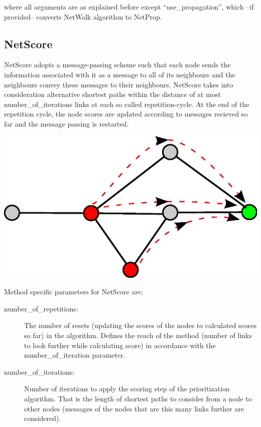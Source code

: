 \documentclass[11pt,twoside]{article}
\begin{document}
\vspace{5 mm}
where all arguments are as explained before except ``use\_propagation'', which --if provided-- converts NetWalk algorithm to NetProp.

\subsection{NetScore}
NetScore adopts a message-passing scheme such that each node sends the 
information associated with it as a message to all of its neighbours and the 
neighbours convey these messages to their neighbours. NetScore takes into 
consideration alternative shortest paths within the distance of at most 
number\_of\_iterations links at each so called repetition-cycle. At the end of 
the repetition cycle, the node scores are updated according to messages 
recieved so far and the message passing is restarted.

\includegraphics[scale=0.5]{netscore.eps}

\vspace{5 mm}
Method specific parameters for NetScore are;
\begin{description}
    \item[number\_of\_repetitions:] The number of resets (updating the scores 
	of the nodes to calculated scores so far) in the algorithm. Defines the 
	reach of the method (number of links to look further while calculating 
	score) in accordance with the number\_of\_iteration parameter.
    \item[number\_of\_iterations:] Number of iterations to apply the scoring 
	step of the prioritization algorithm. That is the length of shortest 
	paths to consider from a node to other nodes (messages of the nodes 
	that are this many links further are considered).
\end{description}
\end{document}

